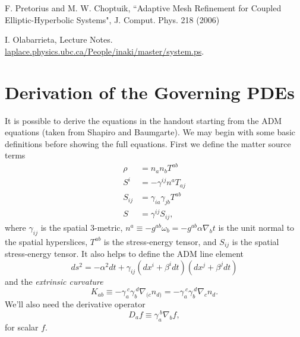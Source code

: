 \documentclass[12pt]{article}
\numberwithin{equation}{section}
\begin{document}
\begin{thebibliography}{widestlabel}
	F. Pretorius and M. W. Choptuik, ``Adaptive Mesh Refinement for Coupled Elliptic-Hyperbolic Systems", J. Comput. Phys. 218 (2006)
	
	I. Olabarrieta, Lecture Notes. \url{laplace.physics.ubc.ca/People/inaki/master/system.ps}.
\end{thebibliography}

\appendix
\section{Derivation of the Governing PDEs}
It is possible to derive the equations in the handout starting from the ADM equations (taken from Shapiro and Baumgarte).  We may begin with some basic definitions before showing the full equations.  First we define the matter source terms
\begin{align}
\rho &= n_a n_b T^{ab} \\
S^i &= -\gamma^{ij} n^a T_{aj} \\
S_{ij} &= \gamma_{ia} \gamma_{jb} T^{ab} \\
S &= \gamma^{ij} S_{ij},
\end{align}
where $\gamma_{ij}$ is the spatial 3-metric, $n^a \equiv - g^{ab} \omega_b = -g^{ab} \alpha \nabla_b t$ is the unit normal to the spatial hyperslices, $T^{ab}$ is the stress-energy tensor, and $S_{ij}$ is the spatial stress-energy tensor.  It also helps to define the ADM line element
\begin{equation} \label{eq:ADM_line_element}
ds^2 = -\alpha^2 dt + \gamma_{ij} (dx^i + \beta^i dt) (dx^j + \beta^j dt)
\end{equation}
and the \textit{extrinsic curvature}
\begin{equation}
K_{ab} \equiv - \gamma_a^{~c} \gamma_b^{~d} \nabla_{(c} n_{d)} = - \gamma_a^{~c} \gamma_b^{~d} \nabla_c n_d.
\end{equation}
We'll also need the derivative operator
\begin{equation}
D_a f \equiv \gamma_{a}^{~b} \nabla_b f,
\end{equation}
for scalar $f$.
\end{document}
